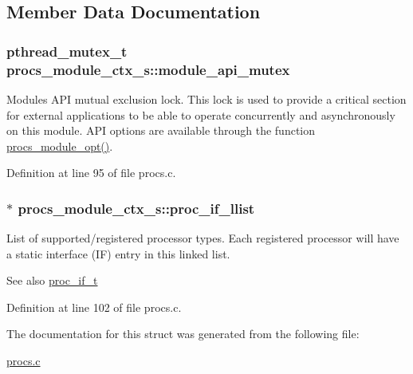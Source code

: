 \subsection{Member Data Documentation}
\subsubsection[{\texorpdfstring{module\+\_\+api\+\_\+mutex}{module_api_mutex}}]{\setlength{\rightskip}{0pt plus 5cm}pthread\+\_\+mutex\+\_\+t procs\+\_\+module\+\_\+ctx\+\_\+s\+::module\+\_\+api\+\_\+mutex}\hypertarget{structprocs__module__ctx__s_a10c3a0b462ead663af1b117abdfdadaa}{}\label{structprocs__module__ctx__s_a10c3a0b462ead663af1b117abdfdadaa}
Module\textquotesingle{}s A\+PI mutual exclusion lock. This lock is used to provide a critical section for external applications to be able to operate concurrently and asynchronously on this module. A\+PI options are available through the function \hyperlink{procs_8c_a226ac6dfd7598a59b9ceab3a92239a80}{procs\+\_\+module\+\_\+opt()}. 

Definition at line 95 of file procs.\+c.

\subsubsection[{\texorpdfstring{proc\+\_\+if\+\_\+llist}{proc_if_llist}}]{$\ast$ procs\+\_\+module\+\_\+ctx\+\_\+s\+::proc\+\_\+if\+\_\+llist}\hypertarget{structprocs__module__ctx__s_a8a7a2cc3f2ee076ae11b7fdc63645f41}{}\label{structprocs__module__ctx__s_a8a7a2cc3f2ee076ae11b7fdc63645f41}
List of supported/registered processor types. Each registered processor will have a static interface (IF) entry in this linked list. \begin{DoxySeeAlso}{See also}
\hyperlink{proc__if_8h_a2b6dbff97f4d62e7a7c7674284620929}{proc\+\_\+if\+\_\+t} 
\end{DoxySeeAlso}


Definition at line 102 of file procs.\+c.



The documentation for this struct was generated from the following file\+:\begin{DoxyCompactItemize}
\item 
\hyperlink{procs_8c}{procs.\+c}\end{DoxyCompactItemize}
